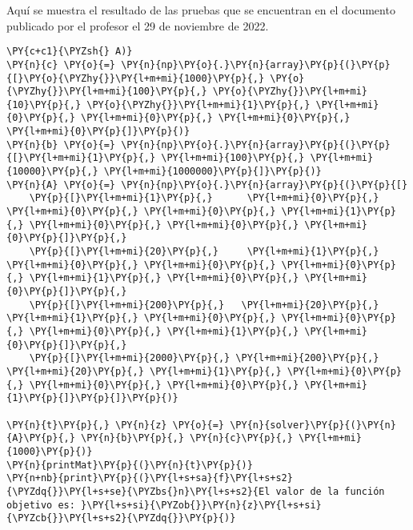 Aquí se muestra el resultado de las pruebas que se encuentran en el documento publicado por el profesor el 29 de noviembre de 2022.

\begin{tcolorbox}[breakable, size=fbox, boxrule=1pt, pad at break*=1mm,colback=cellbackground, colframe=cellborder]
\begin{Verbatim}[commandchars=\\\{\}]
\PY{c+c1}{\PYZsh{} A)}
\PY{n}{c} \PY{o}{=} \PY{n}{np}\PY{o}{.}\PY{n}{array}\PY{p}{(}\PY{p}{[}\PY{o}{\PYZhy{}}\PY{l+m+mi}{1000}\PY{p}{,} \PY{o}{\PYZhy{}}\PY{l+m+mi}{100}\PY{p}{,} \PY{o}{\PYZhy{}}\PY{l+m+mi}{10}\PY{p}{,} \PY{o}{\PYZhy{}}\PY{l+m+mi}{1}\PY{p}{,} \PY{l+m+mi}{0}\PY{p}{,} \PY{l+m+mi}{0}\PY{p}{,} \PY{l+m+mi}{0}\PY{p}{,} \PY{l+m+mi}{0}\PY{p}{]}\PY{p}{)}
\PY{n}{b} \PY{o}{=} \PY{n}{np}\PY{o}{.}\PY{n}{array}\PY{p}{(}\PY{p}{[}\PY{l+m+mi}{1}\PY{p}{,} \PY{l+m+mi}{100}\PY{p}{,} \PY{l+m+mi}{10000}\PY{p}{,} \PY{l+m+mi}{1000000}\PY{p}{]}\PY{p}{)}
\PY{n}{A} \PY{o}{=} \PY{n}{np}\PY{o}{.}\PY{n}{array}\PY{p}{(}\PY{p}{[}
    \PY{p}{[}\PY{l+m+mi}{1}\PY{p}{,}      \PY{l+m+mi}{0}\PY{p}{,}  \PY{l+m+mi}{0}\PY{p}{,} \PY{l+m+mi}{0}\PY{p}{,} \PY{l+m+mi}{1}\PY{p}{,} \PY{l+m+mi}{0}\PY{p}{,} \PY{l+m+mi}{0}\PY{p}{,} \PY{l+m+mi}{0}\PY{p}{]}\PY{p}{,}
    \PY{p}{[}\PY{l+m+mi}{20}\PY{p}{,}     \PY{l+m+mi}{1}\PY{p}{,}  \PY{l+m+mi}{0}\PY{p}{,} \PY{l+m+mi}{0}\PY{p}{,} \PY{l+m+mi}{0}\PY{p}{,} \PY{l+m+mi}{1}\PY{p}{,} \PY{l+m+mi}{0}\PY{p}{,} \PY{l+m+mi}{0}\PY{p}{]}\PY{p}{,}
    \PY{p}{[}\PY{l+m+mi}{200}\PY{p}{,}   \PY{l+m+mi}{20}\PY{p}{,}  \PY{l+m+mi}{1}\PY{p}{,} \PY{l+m+mi}{0}\PY{p}{,} \PY{l+m+mi}{0}\PY{p}{,} \PY{l+m+mi}{0}\PY{p}{,} \PY{l+m+mi}{1}\PY{p}{,} \PY{l+m+mi}{0}\PY{p}{]}\PY{p}{,}
    \PY{p}{[}\PY{l+m+mi}{2000}\PY{p}{,} \PY{l+m+mi}{200}\PY{p}{,} \PY{l+m+mi}{20}\PY{p}{,} \PY{l+m+mi}{1}\PY{p}{,} \PY{l+m+mi}{0}\PY{p}{,} \PY{l+m+mi}{0}\PY{p}{,} \PY{l+m+mi}{0}\PY{p}{,} \PY{l+m+mi}{1}\PY{p}{]}\PY{p}{]}\PY{p}{)}

\PY{n}{t}\PY{p}{,} \PY{n}{z} \PY{o}{=} \PY{n}{solver}\PY{p}{(}\PY{n}{A}\PY{p}{,} \PY{n}{b}\PY{p}{,} \PY{n}{c}\PY{p}{,} \PY{l+m+mi}{1000}\PY{p}{)}
\PY{n}{printMat}\PY{p}{(}\PY{n}{t}\PY{p}{)}
\PY{n+nb}{print}\PY{p}{(}\PY{l+s+sa}{f}\PY{l+s+s2}{\PYZdq{}}\PY{l+s+se}{\PYZbs{}n}\PY{l+s+s2}{El valor de la función objetivo es: }\PY{l+s+si}{\PYZob{}}\PY{n}{z}\PY{l+s+si}{\PYZcb{}}\PY{l+s+s2}{\PYZdq{}}\PY{p}{)}
\end{Verbatim}
\end{tcolorbox}

